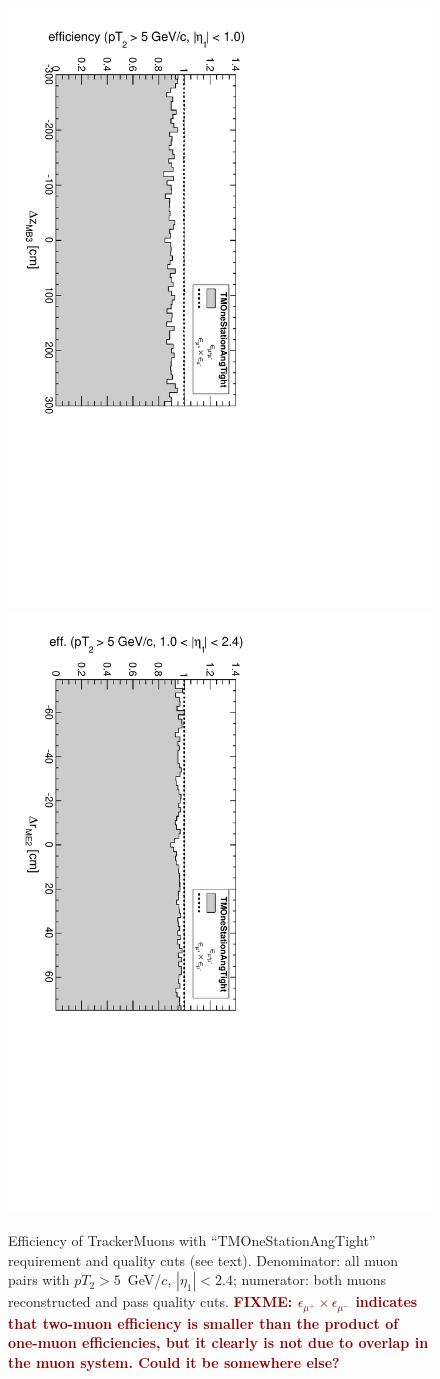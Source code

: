 \documentclass[12pt]{article}
\newcommand{\fixme}[1]{\textcolor{darkred}{\bf FIXME: #1}}
\begin{document}
\begin{figure}
\includegraphics[height=0.5\linewidth, angle=90]{fig/acceptance8_plot/vsmb3dz_TMOneStationAngTight.pdf}
\includegraphics[height=0.5\linewidth, angle=90]{fig/acceptance8_plot/vsme2dr_TMOneStationAngTight.pdf}

\caption{Efficiency of TrackerMuons with ``TMOneStationAngTight'' requirement and quality cuts (see text).  Denominator: all muon pairs with $pT_2 > 5$~GeV/$c$, $|\eta_1| < 2.4$; numerator: both muons reconstructed and pass quality cuts. \fixme{$\epsilon_{\mu^+} \times \epsilon_{\mu^-}$ indicates that two-muon efficiency is smaller than the product of one-muon efficiencies, but it clearly is not due to overlap in the muon system.  Could it be somewhere else?} \label{fig:efficiencies_TMOneStationAngTight}}
\end{figure}
\end{document}
